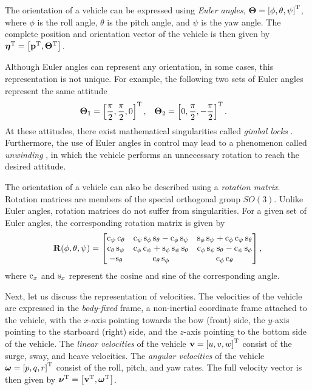 The orientation of a vehicle can be expressed using \emph{Euler angles}, $\bm{\Theta} = \left[\phi, \theta, \psi\right]^{\mathrm{T}}$, where $\phi$ is the roll angle, $\theta$ is the pitch angle, and $\psi$ is the yaw angle.
The complete position and orientation vector of the vehicle is then given by $\bm{\eta}^{\mathrm{T}} = \left[\mathbf{p}^{\mathrm{T}}, \bm{\Theta}^{\mathrm{T}}\right]$.

Although Euler angles can represent any orientation,
in some cases, this representation is not unique.
For example, the following two sets of Euler angles represent the same attitude
\begin{align}
    \bm{\Theta}_1 &= \left[\frac{\pi}{2}, \frac{\pi}{2}, 0\right]^{\mathrm{T}}, &
    \bm{\Theta}_2 &= \left[0, \frac{\pi}{2}, -\frac{\pi}{2}\right]^{\mathrm{T}}. &
\end{align}
At these attitudes, there exist mathematical singularities called \emph{gimbal locks} \cite{chaturvedi_rigid-body_2011}.
Furthermore, the use of Euler angles in control may lead to a phenomenon called \emph{unwinding} \cite{sanjay_topological_2000}, in which the vehicle performs an unnecessary rotation to reach the desired attitude.

The orientation of a vehicle can also be described using a \emph{rotation matrix}.
Rotation matrices are members of the special orthogonal group $SO(3)$.
Unlike Euler angles, rotation matrices do not suffer from singularities.
For a given set of Euler angles, the corresponding rotation matrix is given by \cite{fossen_handbook_2011}
\begin{equation}
    \mathbf{R}(\phi, \theta, \psi)
    =
    \begin{bmatrix} 
        {\rm c}_{\psi}\,{\rm c}_{\theta} & {\rm c}_{\psi}\,{\rm s}_{\phi}\,{\rm s}_{\theta}-{\rm c}_{\phi}\,{\rm s}_{\psi} & {\rm s}_{\phi}\,{\rm s}_{\psi}+{\rm c}_{\phi}\,{\rm c}_{\psi}\,{\rm s}_{\theta}\\ {\rm c}_{\theta}\,{\rm s}_{\psi} & {\rm c}_{\phi}\,{\rm c}_{\psi}+{\rm s}_{\phi}\,{\rm s}_{\psi}\,{\rm s}_{\theta} & {\rm c}_{\phi}\,{\rm s}_{\psi}\,{\rm s}_{\theta}-{\rm c}_{\psi}\,{\rm s}_{\phi}\\ -{\rm s}_{\theta} & {\rm c}_{\theta}\,{\rm s}_{\phi} & {\rm c}_{\phi}\,{\rm c}_{\theta} 
    \end{bmatrix},
    \label{eq:background_Rzyx}
\end{equation}
where ${\rm c}_x$ and ${\rm s}_x$ represent the cosine and sine of the corresponding angle.

Next, let us discuss the representation of velocities.
The velocities of the vehicle are expressed in the \emph{body-fixed} frame, a non-inertial coordinate frame attached to the vehicle, with the $x$-axis pointing towards the bow (front) side, the $y$-axis pointing to the starboard (right) side, and the $z$-axis pointing to the bottom side of the vehicle.
The \emph{linear velocities} of the vehicle $\mathbf{v} = \left[u, v, w\right]^{\mathrm{T}}$ consist of the surge, sway, and heave velocities.
The \emph{angular velocities} of the vehicle $\bm{\omega} = \left[p, q, r\right]^{\mathrm{T}}$ consist of the roll, pitch, and yaw rates.
The full velocity vector is then given by $\bm{\nu}^{\mathrm{T}} = \left[\mathbf{v}^{\mathrm{T}}, \bm{\omega}^{\mathrm{T}}\right]$.

